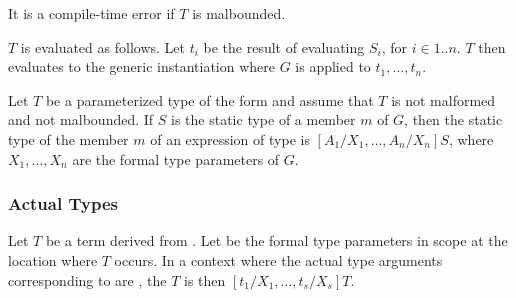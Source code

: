 \documentclass[makeidx]{article}
\begin{document}
{\LMHash{}%
It is a compile-time error if $T$ is malbounded.

\LMHash{}%
$T$ is evaluated as follows.
Let $t_i$ be the result of evaluating $S_i$, for $i \in 1 .. n$.
$T$ then evaluates to the generic instantiation
where $G$ is applied to $t_1, \ldots, t_n$.

\LMHash{}%
Let $T$ be a parameterized type of the form
and assume that $T$ is not malformed and not malbounded.
If $S$ is the static type of a member $m$ of $G$,
then the static type of the member $m$ of an expression of type
is
$[A_1/X_1, \ldots, A_n/X_n]S$,
where $X_1, \ldots, X_n$ are the formal type parameters of $G$.



\subsubsection{Actual Types}

%

\LMHash{}%
Let $T$ be a term derived from .
Let  be the formal type parameters in scope
at the location where $T$ occurs.
In a context where the actual type arguments corresponding to
 are ,
the  $T$ is then
$[t_1/X_1, \ldots, t_s/X_s]T$.

}
\end{document}
